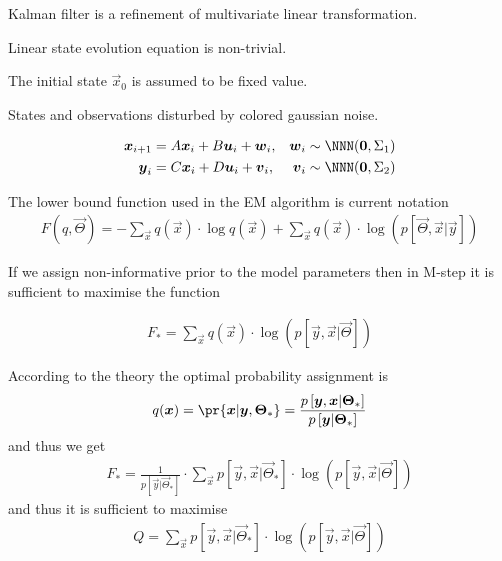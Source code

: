 \documentclass[landscape,footrule]{foils}
\newcommand{\pd}[1]{p\left[#1\right]}
\begin{document}
Kalman filter is a refinement of multivariate linear transformation.
\begin{triangles}
\item Linear state evolution equation is non-trivial.
\item The initial state $\vec{x}_0$ is assumed to be fixed value.
\item States and observations disturbed by colored gaussian noise. 
\end{triangles}
\begin{align*}
\vec{x}_{i+1}&=A\vec{x}_{i}+B\vec{u}_{i}+\vec{w}_{i}, &\vec{w}_{i}&\sim \NNN(\vec{0}, \Sigma_1)\\
\vec{y}_i&=C\vec{x}_i+D\vec{u}_i+\vec{v}_i, &\vec{v}_{i}&\sim \NNN(\vec{0}, \Sigma_2)
\end{align*}




The lower bound function used in the EM algorithm is current notation
\begin{align*}
F(q,\vec{\Theta})= -\sum_{\vec{x}}q(\vec{x})\cdot\log q(\vec{x})+
 \sum_{\vec{x}}q(\vec{x})\cdot\log\left(\pd{\vec{\Theta},\vec{x}|\vec{y}}\right)
\end{align*}

If we assign non-informative prior to the model parameters then in M-step it is sufficient to maximise the function

\begin{align*}
F_*=\sum_{\vec{x}}q(\vec{x})\cdot\log\left(\pd{\vec{y},\vec{x}|\vec{\Theta}}\right)
\end{align*}  


According to the theory the optimal probability assignment is
\begin{align*}
q(\vec{x})=\pr{\vec{x}|\vec{y},\vec{\Theta}_*}=\frac{\pd{\vec{y},\vec{x}|\vec{\Theta}_*}}{\pd{\vec{y}|\vec{\Theta}_*}}
\end{align*}
and thus we get
\begin{align*}
F_*=\frac{1}{\pd{\vec{y}|\vec{\Theta}_*}}\cdot\sum_{\vec{x}}\pd{\vec{y},\vec{x}|\vec{\Theta}_*}\cdot\log\left(\pd{\vec{y},\vec{x}|\vec{\Theta}}\right)
\end{align*}  
and thus it is sufficient to maximise
\begin{align*}
Q=\sum_{\vec{x}}\pd{\vec{y},\vec{x}|\vec{\Theta}_*}\cdot\log\left(\pd{\vec{y},\vec{x}|\vec{\Theta}}\right)
\end{align*}
\end{document}
